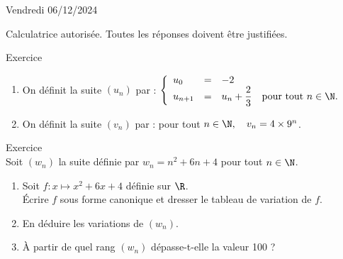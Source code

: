 \documentclass[a4paper,11pt,eval]{nsi}
\newcounter{exoNum}
\newcommand{\exo}[1]
{
	\addtocounter{exoNum}{1}
	{\titlefont\color{UGLiBlue}\Large Exercice\ \theexoNum\ \normalsize{#1}}\smallskip	
}
\begin{document}
\textcolor{UGLiBlue}{Vendredi 06/12/2024}\\
\maketitle
\begin{center}
	Calculatrice autorisée. Toutes les réponses doivent être justifiées.
\end{center}

\vspace{1cm}

\exo{}
\begin{enumerate}
    \item On définit la suite $(u_n)$ par : $\left\{
	\begin{array}{llll}
		u_0 & = & -2 &\\
		u_{n+1} & = & u_n + \dfrac{2}{3} & \text{pour tout } n\in\N.\\
	\end{array}
	\right. $
	\newpage
    \item On définit la suite $(v_n)$ par : pour tout $n\in\N, \quad v_n=4\times 9^n$.
\end{enumerate}

\vspace*{1cm}
\exo{}\\
Soit $(w_n)$ la suite définie par $w_n=n^2+6n+4$ pour tout $n\in \N$.
\begin{enumerate}
	\item 	Soit $f:x\mapsto x^2+6x+4$ définie sur $\R$.\\
	\'Ecrire $f$ sous forme canonique et dresser le tableau de variation de $f$.
	\item 	En déduire les variations de $(w_n)$.
	\item	À partir de quel rang $(w_n)$ dépasse-t-elle la valeur 100 ?\\
\end{enumerate}
\end{document}
